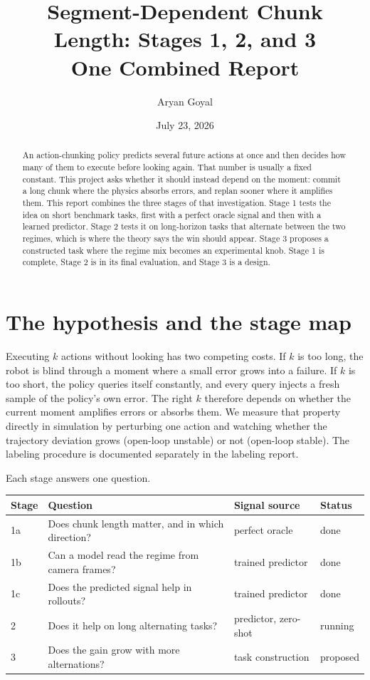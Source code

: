 \documentclass[11pt]{article}
\title{Segment-Dependent Chunk Length: Stages 1, 2, and 3\\
\large One Combined Report}
\author{Aryan Goyal}
\date{July 23, 2026}
\begin{document}
\maketitle

\begin{abstract}
\noindent
An action-chunking policy predicts several future actions at once and then
decides how many of them to execute before looking again. That number is
usually a fixed constant. This project asks whether it should instead depend
on the moment: commit a long chunk where the physics absorbs errors, and
replan sooner where it amplifies them. This report combines the three stages
of that investigation. Stage 1 tests the idea on short benchmark tasks, first
with a perfect oracle signal and then with a learned predictor. Stage 2 tests
it on long-horizon tasks that alternate between the two regimes, which is
where the theory says the win should appear. Stage 3 proposes a constructed
task where the regime mix becomes an experimental knob. Stage 1 is complete,
Stage 2 is in its final evaluation, and Stage 3 is a design.
\end{abstract}

\tableofcontents
\newpage

\section{The hypothesis and the stage map}

Executing $k$ actions without looking has two competing costs. If $k$ is too
long, the robot is blind through a moment where a small error grows into a
failure. If $k$ is too short, the policy queries itself constantly, and every
query injects a fresh sample of the policy's own error. The right $k$
therefore depends on whether the current moment amplifies errors or absorbs
them. We measure that property directly in simulation by perturbing one
action and watching whether the trajectory deviation grows (open-loop
unstable) or not (open-loop stable). The labeling procedure is documented
separately in the labeling report.

Each stage answers one question.

\begin{center}
\small
\begin{tabular}{@{}llll@{}}
\toprule
Stage & Question & Signal source & Status \\
\midrule
1a & Does chunk length matter, and in which direction? & perfect oracle & done \\
1b & Can a model read the regime from camera frames? & trained predictor & done \\
1c & Does the predicted signal help in rollouts? & trained predictor & done \\
2  & Does it help on long alternating tasks? & predictor, zero-shot & running \\
3  & Does the gain grow with more alternations? & task construction & proposed \\
\bottomrule
\end{tabular}
\end{center}
\end{document}

